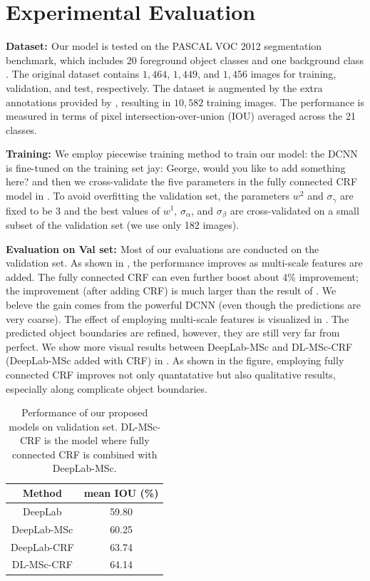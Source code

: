 \section{Experimental Evaluation}
\label{sec:experiments}

{\bf{Dataset: }} Our model is tested on the PASCAL VOC 2012 segmentation benchmark, which includes 20 foreground object classes and one background class \citep{everingham2014pascal}. The original dataset contains $1,464$, $1,449$, and $1,456$ images for training, validation, and test, respectively. The dataset is augmented by the extra annotations provided by \citep{hariharan2011semantic}, resulting in $10,582$ training images. The performance is measured in terms of pixel intersection-over-union (IOU) averaged across the 21 classes. 

{\bf{Training: }} We employ piecewise training method to train our model: the DCNN is fine-tuned on the training set {\color{red}jay: George, would you like to add something here?} and then we cross-validate the five parameters in the fully connected CRF model in . To avoid overfitting the validation set, the parameters $w^2$ and $\sigma_\gamma$ are fixed to be $3$ and the best values of $w^1$, $\sigma_\alpha$, and $\sigma_\beta$ are cross-validated on a small subset of the validation set (we use only 182 images).  

{\bf{Evaluation on Val set: }} Most of our evaluations are conducted on the validation set. As shown in , the performance improves as multi-scale features are added. The fully connected CRF can even further boost about 4\% improvement; the improvement (after adding CRF) is much larger than the result of \citet{krahenbuhl2011efficient}. We beleve the gain comes from the powerful DCNN (even though the predictions are very coarse). The effect of employing multi-scale features is visualized in . The predicted object boundaries are refined, however, they are still very far from perfect. We show more visual results between DeepLab-MSc and DL-MSc-CRF (DeepLab-MSc added with CRF) in . As shown in the figure, employing fully connected CRF improves not only quantatative but also qualitative results, especially along complicate object boundaries.

\begin{table}
  \centering
  \begin{tabular}{c | c}
    Method      & mean IOU (\%) \\
    \hline
    DeepLab     & 59.80 \\
    DeepLab-MSc & 60.25 \\
    DeepLab-CRF & 63.74 \\
    DL-MSc-CRF  & 64.14 \\
  \end{tabular}
  \caption{Performance of our proposed models on validation set. DL-MSc-CRF is the model where fully connected CRF is combined with DeepLab-MSc.}
  \label{tb:valIOU}
\end{table}

